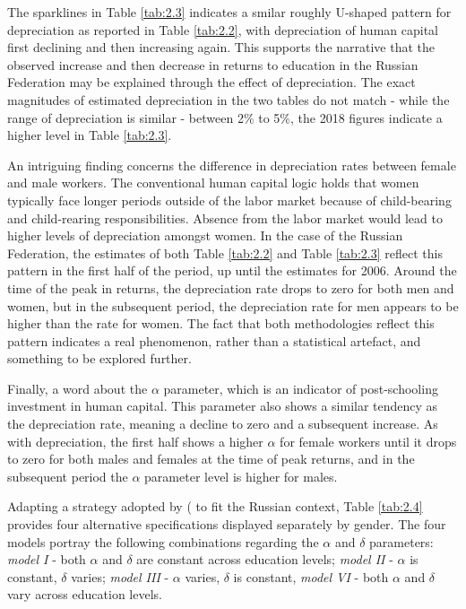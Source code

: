 \documentclass[12pt,a4paper]{article}
\numberwithin{equation}{section}
\begin{document}
\setcounter{table}{3} %

The sparklines in Table \ref{tab:2.3} indicates a smilar roughly U-shaped  pattern for depreciation as reported in Table \ref{tab:2.2}, with depreciation of human capital first declining and then increasing again. This supports the narrative that the observed increase and then decrease in returns to education in the Russian Federation may be explained through the effect of depreciation. The  exact magnitudes of estimated depreciation in the two tables do not match - while the range of depreciation is similar - between 2\% to 5\%, the 2018 figures indicate a higher level in Table \ref{tab:2.3}. 

\vspace{3pt}

An intriguing finding concerns the difference in depreciation rates between female and male workers. The conventional human capital logic holds that women typically face longer periods outside of the labor market because of child-bearing and child-rearing responsibilities. Absence from the labor market would lead to higher levels of depreciation amongst women. In the case of the Russian Federation, the estimates of both Table \ref{tab:2.2} and Table \ref{tab:2.3} reflect this pattern in the first half of the period, up until the estimates for 2006. Around the time of the peak in returns, the depreciation rate drops to zero for both men and women, but in the subsequent period, the depreciation rate for men appears to be higher than the rate for women. The fact that both methodologies reflect this pattern indicates a real phenomenon, rather than a statistical artefact, and something to be explored further. 

\vspace{3pt}

Finally, a word about the $\alpha$ parameter, which is an indicator of post-schooling investment in human capital. This parameter also shows a similar tendency as the depreciation rate, meaning a decline to zero and a subsequent  increase. As with depreciation, the first half shows a higher $\alpha$ for female workers until it drops to zero for both males and females at the time of peak returns, and in the subsequent period the $\alpha$ parameter level is higher for males. 

\vspace{3pt}

Adapting a strategy adopted by (\citet{weber_173._2008} to fit the Russian context, Table \ref{tab:2.4} provides four alternative specifications displayed separately by gender. The four models portray the following combinations regarding the $\alpha$  and $\delta$ parameters: \textit{model I} - both $\alpha$ and $\delta$ are constant across education levels; \textit{model II} - $\alpha$ is constant, $\delta$ varies; \textit{model III} - $\alpha$ varies, $\delta$ is constant, \textit{model VI} - both $\alpha$ and $\delta$ vary across education levels.
\end{document}
